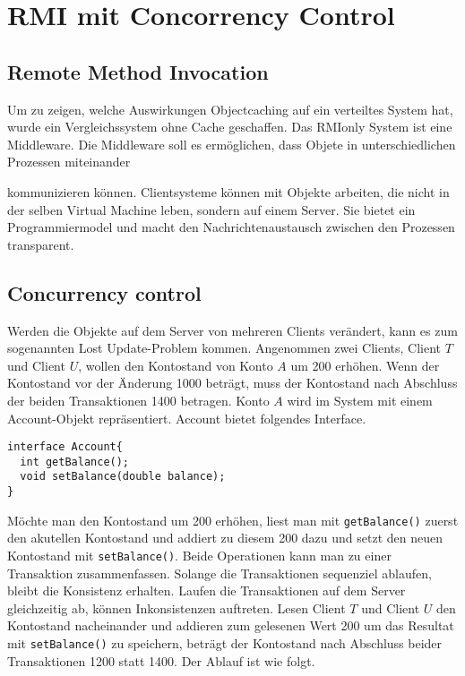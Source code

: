 \chapter{RMI mit Concorrency Control}

\section{Remote Method Invocation}
\label{sec:remote-meth-invoc}

Um zu zeigen, welche Auswirkungen Objectcaching auf ein verteiltes
System hat, wurde ein Vergleichssystem ohne Cache geschaffen. Das
RMIonly System ist eine Middleware. Die Middleware soll es
ermöglichen, dass Objete in unterschiedlichen Prozessen miteinander


kommunizieren können. Clientsysteme können mit Objekte arbeiten, die
nicht in der selben Virtual Machine leben, sondern auf einem Server. Sie bietet ein Programmiermodel
und macht den Nachrichtenaustausch zwischen den Prozessen transparent.


\section{Concurrency control}
\label{sec:concurrency-control}
Werden die Objekte auf dem Server von mehreren Clients verändert, kann
es zum sogenannten Lost Update-Problem kommen. Angenommen zwei
Clients, Client $T$ und Client $U$, wollen den Kontostand von Konto
$A$ um 200 erhöhen. Wenn der Kontostand vor der Änderung 1000 beträgt,
muss der Kontostand nach Abschluss der beiden Transaktionen 1400
betragen. Konto $A$ wird im System mit einem Account-Objekt
repräsentiert. Account bietet folgendes Interface.

\lstset{language=Java}
\begin{lstlisting}
interface Account{
  int getBalance();
  void setBalance(double balance);
}
\end{lstlisting}

Möchte man den Kontostand um 200 erhöhen, liest man mit \newline
\verb|getBalance()| zuerst den akutellen Kontostand und addiert zu
diesem 200 dazu und setzt den neuen Kontostand mit
\verb|setBalance()|. Beide Operationen kann man zu einer Transaktion
zusammenfassen. Solange die Transaktionen sequenziel ablaufen, bleibt die
Konsistenz erhalten. Laufen die Transaktionen auf dem Server
gleichzeitig ab, können Inkonsistenzen auftreten. Lesen Client $T$ und
Client $U$ den Kontostand nacheinander und addieren zum gelesenen Wert
200 um das Resultat mit \verb|setBalance()| zu speichern, beträgt der
Kontostand nach Abschluss beider Transaktionen 1200 statt 1400. Der
Ablauf ist wie folgt.


